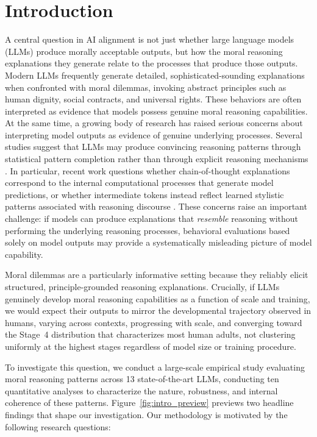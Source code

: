 \documentclass{article}
\begin{document}
\section{Introduction}

A central question in AI alignment is not just whether large language models (LLMs) produce morally acceptable outputs, but how the moral reasoning explanations they generate relate to the processes that produce those outputs. Modern LLMs frequently generate detailed, sophisticated-sounding explanations when confronted with moral dilemmas, invoking abstract principles such as human dignity, social contracts, and universal rights. These behaviors are often interpreted as evidence that models possess genuine moral reasoning capabilities. At the same time, a growing body of research has raised serious concerns about interpreting model outputs as evidence of genuine underlying processes. Several studies suggest that LLMs may produce convincing reasoning patterns through statistical pattern completion rather than through explicit reasoning mechanisms \citep{turpin2023language, chen2025reasoning}. In particular, recent work questions whether chain-of-thought explanations correspond to the internal computational processes that generate model predictions, or whether intermediate tokens instead reflect learned stylistic patterns associated with reasoning discourse \citep{kambhampati2024planllms}. These concerns raise an important challenge: if models can produce explanations that \emph{resemble} reasoning without performing the underlying reasoning processes, behavioral evaluations based solely on model outputs may provide a systematically misleading picture of model capability.

Moral dilemmas are a particularly informative setting because they reliably elicit structured, principle-grounded reasoning explanations. Crucially, if LLMs genuinely develop moral reasoning capabilities as a function of scale and training, we would expect their outputs to mirror the developmental trajectory observed in humans, varying across contexts, progressing with scale, and converging toward the Stage~4 distribution that characterizes most human adults, not clustering uniformly at the highest stages regardless of model size or training procedure.

To investigate this question, we conduct a large-scale empirical study evaluating moral reasoning patterns across 13 state-of-the-art LLMs, conducting ten quantitative analyses to characterize the nature, robustness, and internal coherence of these patterns. Figure~\ref{fig:intro_preview} previews two headline findings that shape our investigation. Our methodology is motivated by the following research questions:
\end{document}
